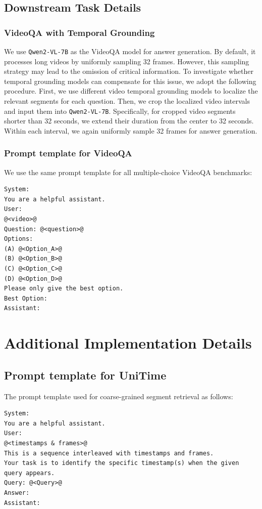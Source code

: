 \subsection{Downstream Task Details}
\label{sub:donwstream}
\subsubsection{VideoQA with Temporal Grounding}

We use \texttt{Qwen2-VL-7B} as the VideoQA model for answer generation. By default, it processes long videos by uniformly sampling 32 frames. However, this sampling strategy may lead to the omission of critical information. To investigate whether temporal grounding models can compensate for this issue, we adopt the following procedure. First, we use different video temporal grounding models to localize the relevant segments for each question. Then, we crop the localized video intervals and input them into \texttt{Qwen2-VL-7B}. Specifically, for cropped video segments shorter than 32 seconds, we extend their duration from the center to 32 seconds. Within each interval, we again uniformly sample 32 frames for answer generation.

\subsubsection{Prompt template for VideoQA}
We use the same prompt template for all multiple-choice VideoQA benchmarks:

\begin{lstlisting}
System:
You are a helpful assistant.
User: 
@<video>@
Question: @<question>@
Options:
(A) @<Option_A>@
(B) @<Option_B>@
(C) @<Option_C>@
(D) @<Option_D>@
Please only give the best option.
Best Option:
Assistant:
\end{lstlisting}

\section{Additional Implementation Details}
\label{sec:implementation}

\subsection{Prompt template for UniTime}
\label{sub:prompt_unitime}

The prompt template used for coarse-grained segment retrieval as follows:

\begin{lstlisting}
System:
You are a helpful assistant.
User: 
@<timestamps & frames>@
This is a sequence interleaved with timestamps and frames. 
Your task is to identify the specific timestamp(s) when the given query appears.
Query: @<Query>@
Answer:
Assistant:
\end{lstlisting}

